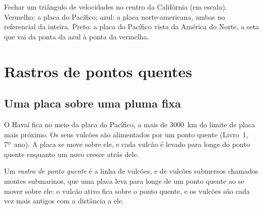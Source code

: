 \begin{omfigure}

{\small Fechar um triângulo de velocidades no centro da Califórnia (em
escala). Vermelho: a placa do Pacífico; azul: a placa norte-americana, ambas
no referencial da  inteira. Preto: a placa do Pacífico vista da
América do Norte, a seta que vai da ponta da azul à ponta da vermelha.}
\end{omfigure}

\section{Rastros de pontos quentes}

\subsection{Uma placa sobre uma pluma fixa}

O Havaí fica no meio da placa do Pacífico, a mais de \qty{3000}{km} do
limite de placa mais próximo.
 Os seus vulcões são alimentados por um ponto quente (Livro~1,
7º~ano). A placa se move sobre ele, e cada vulcão é levado para longe do
ponto quente enquanto um novo cresce atrás dele.

\begin{definition}\label{def:g11:plate-motions:hotspot-track}
Um \emph{rastro de ponto quente} é a linha de
vulcões, e de vulcões submersos chamados montes submarinos, que uma placa
leva para longe de um ponto quente ao se mover sobre ele: o vulcão ativo
fica sobre o ponto quente, e os vulcões são cada vez mais antigos com a
distância a ele.
\end{definition}

